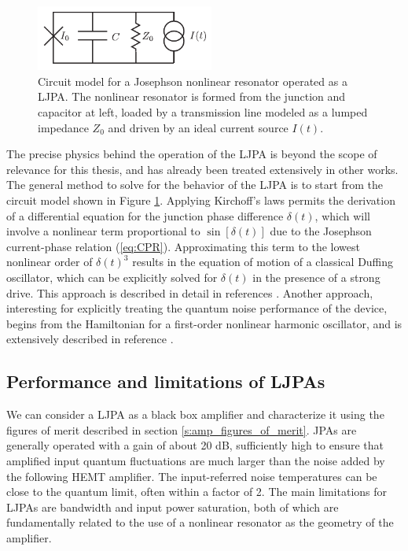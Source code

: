 \begin{figure}
\begin{center}
	\includegraphics[width = 2.3in]{paramps_chapter/JPA_circuit}
\end{center}
\caption[Circuit model for LJPA]{Circuit model for a Josephson nonlinear resonator operated as a LJPA.  The nonlinear resonator is formed from the junction and capacitor at left, loaded by a transmission line modeled as a lumped impedance $Z_0$ and driven by an ideal current source $I(t)$.}
\label{fig:JPA_circuit}
\end{figure}

The precise physics behind the operation of the LJPA is beyond the scope of relevance for this thesis, and has already been treated extensively in other works.  The general method to solve for the behavior of the LJPA is to start from the circuit model shown in Figure \ref{fig:JPA_circuit}.  Applying Kirchoff's laws permits the derivation of a differential equation for the junction phase difference $\delta(t)$, which will involve a nonlinear term proportional to $\sin[{\delta}(t)]$ due to the Josephson current-phase relation (\ref{eq:CPR}).  Approximating this term to the lowest nonlinear order of $\delta(t)^3$ results in the equation of motion of a classical Duffing oscillator, which can be explicitly solved for $\delta(t)$ in the presence of a strong drive.  This approach is described in detail in references \cite{slichterthesis,castaellanosthesis}.  Another approach, interesting for explicitly treating the quantum noise performance of the device, begins from the Hamiltonian for a first-order nonlinear harmonic oscillator, and is extensively described in reference \cite{eichlerthesis}.

\subsection{Performance and limitations of LJPAs}\label{s:jpa_perf}

We can consider a LJPA as a black box amplifier and characterize it using the figures of merit described in section \ref{s:amp_figures_of_merit}.  JPAs are generally operated with a gain of about 20 dB, sufficiently high to ensure that amplified input quantum fluctuations are much larger than the noise added by the following HEMT amplifier.  The input-referred noise temperatures can be close to the quantum limit, often within a factor of 2.  The main limitations for LJPAs are bandwidth and input power saturation, both of which are fundamentally related to the use of a nonlinear resonator as the geometry of the amplifier.

